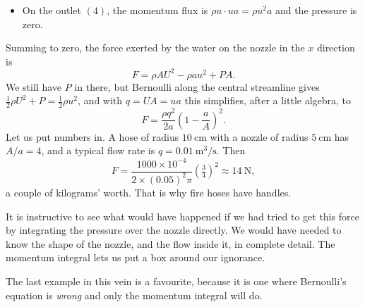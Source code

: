 \documentclass[a4paper]{scrartcl}
\begin{document}
\begin{example}
\begin{itemize}
		\item On the outlet $(4)$, the momentum flux is $\rho u \cdot u a = \rho u^2 a$ and the pressure is zero.
	\end{itemize}
	Summing to zero, the force exerted by the water on the nozzle in the $x$ direction is
	$$
	F = \rho A U^2 - \rho a u^2 + PA.
	$$
	We still have $P$ in there, but Bernoulli along the central streamline gives $\tfrac{1}{2}\rho U^2 + P = \tfrac{1}{2}\rho u^2$, and with $q = UA = ua$ this simplifies, after a little algebra, to
	$$
	F = \frac{\rho q^2}{2a}\left(1 - \frac{a}{A}\right)^2.
	$$
	Let us put numbers in. A hose of radius $\SI{10}{\centi\meter}$ with a nozzle of radius $\SI{5}{\centi\meter}$ has $A/a = 4$, and a typical flow rate is $q = \SI{0.01}{\meter\cubed\per\second}$. Then
	$$
	F = \frac{1000 \times 10^{-4}}{2 \times (0.05)^2\pi}\left(\tfrac{3}{4}\right)^2 \approx \SI{14}{\newton},
	$$
	a couple of kilograms' worth. That is why fire hoses have handles.
\end{example}

\begin{remark}
	It is instructive to see what would have happened if we had tried to get this force by integrating the pressure over the nozzle directly. We would have needed to know the shape of the nozzle, and the flow inside it, in complete detail. The momentum integral lets us put a box around our ignorance.
\end{remark}

The last example in this vein is a favourite, because it is one where Bernoulli's equation is \emph{wrong} and only the momentum integral will do.
\end{document}
